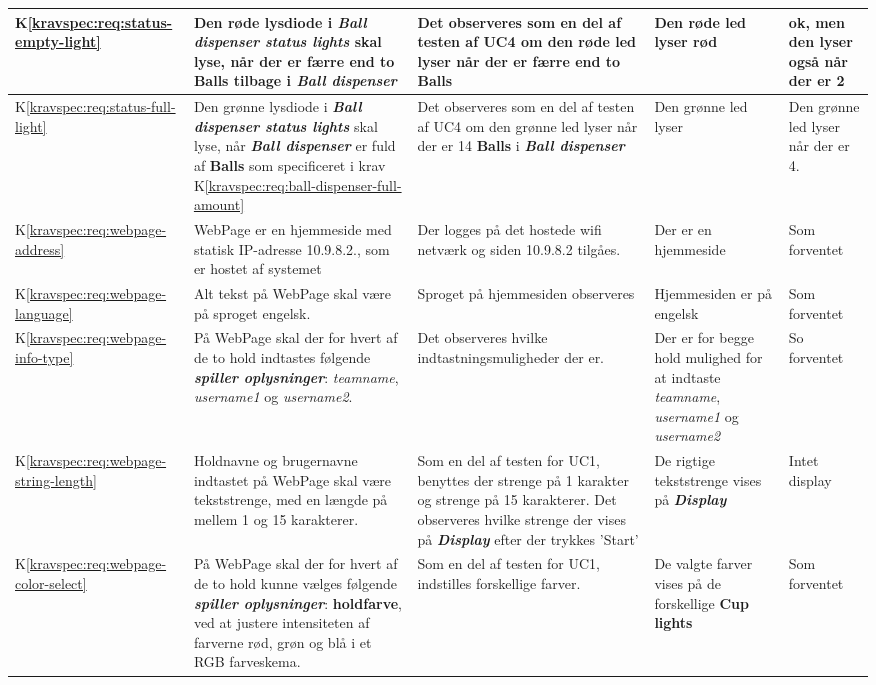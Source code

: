 \documentclass[Accepttestspecifikation/Accepttest_Main.tex]{subfiles}
\begin{document}
\begin{longtable}{|L{0.08\textwidth}|L{0.3\textwidth}|L{0.3\textwidth}|L{0.2\textwidth}|L{0.2\textwidth}|}
K\ref{kravspec:req:status-empty-light} & Den røde lysdiode i \textit{\textbf{Ball dispenser status lights}} skal lyse, når der er færre end to \textbf{Balls} tilbage i \textit{\textbf{Ball dispenser}} & Det observeres som en del af testen af UC4 om den røde led lyser når der er færre end to \textbf{Balls} & Den røde led lyser rød & ok, men den lyser også når der er 2 \\ \hline
K\ref{kravspec:req:status-full-light}& Den grønne lysdiode i \textit{\textbf{Ball dispenser status lights}} skal lyse, når \textit{\textbf{Ball dispenser}} er fuld af \textbf{Balls} som specificeret i krav K\ref{kravspec:req:ball-dispenser-full-amount} & Det observeres som en del af testen af UC4 om den grønne led lyser når der er 14 \textbf{Balls} i \textbf{\textit{Ball dispenser}} & Den grønne led lyser & Den grønne led lyser når der er 4.   \\ \hline
K\ref{kravspec:req:webpage-address} & WebPage er en hjemmeside med statisk IP-adresse 10.9.8.2., som er hostet af systemet & Der logges på det hostede wifi netværk og siden 10.9.8.2 tilgåes. & Der er en hjemmeside & Som forventet\\ \hline
K\ref{kravspec:req:webpage-language} & Alt tekst på WebPage skal være på sproget engelsk. & Sproget på hjemmesiden observeres & Hjemmesiden er på engelsk & Som forventet\\ \hline
K\ref{kravspec:req:webpage-info-type} & På WebPage skal der for hvert af de to hold indtastes følgende \textit{\textbf{spiller oplysninger}}: \textit{teamname}, \textit{username1} og \textit{username2}. & Det observeres hvilke indtastningsmuligheder der er. &  Der er for begge hold mulighed for at indtaste \textit{teamname}, \textit{username1} og \textit{username2}&  So forventet\\ \hline
K\ref{kravspec:req:webpage-string-length} & Holdnavne og brugernavne indtastet på WebPage skal være tekststrenge, med en længde på mellem 1 og 15 karakterer. & Som en del af testen for UC1, benyttes der strenge på 1 karakter og strenge på 15 karakterer. Det observeres hvilke strenge der vises på \textbf{\textit{Display}} efter der trykkes 'Start' & De rigtige tekststrenge vises på \textbf{\textit{Display}} & Intet display\\ \hline
K\ref{kravspec:req:webpage-color-select} & På WebPage skal der for hvert af de to hold kunne vælges følgende \textit{\textbf{spiller oplysninger}}: \textbf{holdfarve}, ved at justere intensiteten af farverne rød, grøn og blå i et RGB farveskema. & Som en del af testen for UC1, indstilles forskellige farver. & De valgte farver vises på de forskellige \textbf{Cup lights} & Som forventet\\ \hline

\end{longtable}
\end{document}
